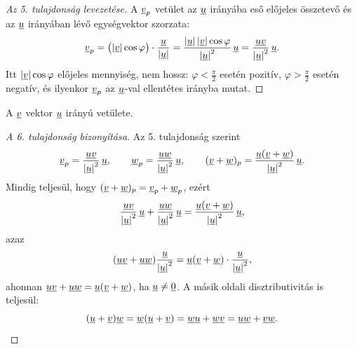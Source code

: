 \documentclass[11pt]{article}
\begin{document}
\begin{proof}[Az 5. tulajdonság levezetése]
A $\underline{v}_{p}$ vetület az $\underline{u}$ irányába eső előjeles összetevő és az $\underline{u}$ irányában lévő egységvektor szorzata:
\[
\underline{v}_{p}=\bigl(\left|\underline{v}\right|\cos\varphi\bigr)\cdot\frac{\underline{u}}{\left|\underline{u}\right|}
=\frac{\left|\underline{u}\right|\left|\underline{v}\right|\cos\varphi}{\left|\underline{u}\right|^{2}}\,\underline{u}
=\frac{\underline{u}\underline{v}}{\left|\underline{u}\right|^{2}}\,\underline{u} .
\]
Itt $\left|\underline{v}\right|\cos\varphi$ előjeles mennyiség, nem hossz: $\varphi<\tfrac{\pi}{2}$ esetén pozitív, $\varphi>\tfrac{\pi}{2}$ esetén negatív, és ilyenkor $\underline{v}_{p}$ az $\underline{u}$-val ellentétes irányba mutat.
\end{proof}

\begin{notefig}{A $\underline{v}$ vektor $\underline{u}$ irányú vetülete.}
\end{notefig}

\begin{proof}[A 6. tulajdonság bizonyítása]
Az 5. tulajdonság szerint
\[
\underline{v}_{p}=\frac{\underline{u}\underline{v}}{\left|\underline{u}\right|^{2}}\,\underline{u},\qquad
\underline{w}_{p}=\frac{\underline{u}\underline{w}}{\left|\underline{u}\right|^{2}}\,\underline{u},\qquad
(\underline{v}+\underline{w})_{p}=\frac{\underline{u}(\underline{v}+\underline{w})}{\left|\underline{u}\right|^{2}}\,\underline{u} .
\]
Mindig teljesül, hogy $(\underline{v}+\underline{w})_{p}=\underline{v}_{p}+\underline{w}_{p}$, ezért
\[
\frac{\underline{u}\underline{v}}{\left|\underline{u}\right|^{2}}\,\underline{u}+\frac{\underline{u}\underline{w}}{\left|\underline{u}\right|^{2}}\,\underline{u}
=\frac{\underline{u}(\underline{v}+\underline{w})}{\left|\underline{u}\right|^{2}}\,\underline{u},
\]
azaz
\[
(\underline{u}\underline{v}+\underline{u}\underline{w})\frac{\underline{u}}{\left|\underline{u}\right|^{2}}
=\underline{u}(\underline{v}+\underline{w})\cdot\frac{\underline{u}}{\left|\underline{u}\right|^{2}},
\]
ahonnan $\underline{u}\underline{v}+\underline{u}\underline{w}=\underline{u}(\underline{v}+\underline{w})$, ha $\underline{u}\neq\underline{0}$. A másik oldali disztributivitás is teljesül:
\[
(\underline{u}+\underline{v})\underline{w}=\underline{w}(\underline{u}+\underline{v})=\underline{w}\underline{u}+\underline{w}\underline{v}=\underline{u}\underline{w}+\underline{v}\underline{w} .
\]
\end{proof}
\end{document}
